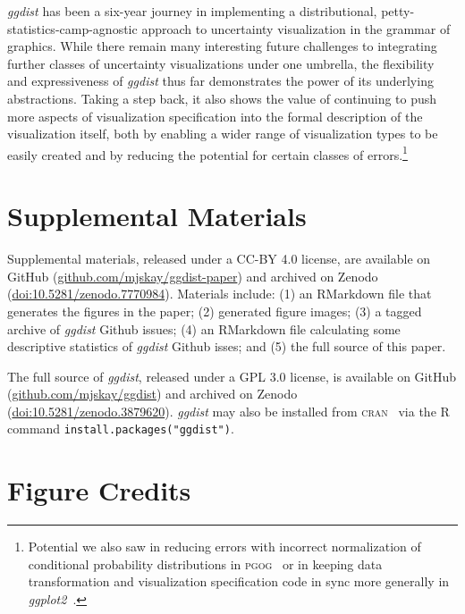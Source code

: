\documentclass[journal]{vgtc}                     %
\begin{document}
\textit{ggdist} has been a six-year journey in implementing a distributional, petty-statistics-camp-agnostic approach to uncertainty visualization in the grammar of graphics. While there remain many interesting future challenges to integrating further classes of uncertainty visualizations under one umbrella, the flexibility and expressiveness of \textit{ggdist} thus far demonstrates the power of its underlying abstractions. Taking a step back, it also shows the value of continuing to push more aspects of visualization specification into the formal description of the visualization itself, both by enabling a wider range of visualization types to be easily created and by reducing the potential for certain classes of errors.\footnote{Potential we also saw in reducing errors with incorrect normalization of conditional probability distributions in \textsc{pgog}~\cite{pu2020probabilistic} or in keeping data transformation and visualization specification code in sync more generally in \textit{ggplot2}~\cite{pu2023inpractice}.} 

\section*{Supplemental Materials}
\label{sec:supplemental_materials}

Supplemental materials, released under a CC-BY 4.0 license, are available on GitHub (\href{https://github.com/mjskay/ggdist-paper}{github.com/mjskay/ggdist-paper}) and archived on Zenodo (\href{https://doi.org/10.5281/zenodo.7770984}{doi:10.5281/zenodo.7770984}).
Materials include: (1) an RMarkdown file that generates the figures in the paper; (2) generated figure images; (3) a tagged archive of \textit{ggdist} Github issues; (4) an RMarkdown file calculating some descriptive statistics of \textit{ggdist} Github isses; and (5) the full source of this paper.

The full source of \textit{ggdist}, released under a GPL 3.0 license, is available on GitHub (\href{https://github.com/mjskay/ggdist}{github.com/mjskay/ggdist}) and archived on Zenodo (\href{https://doi.org/10.5281/zenodo.3879620}{doi:10.5281/zenodo.3879620}). \textit{ggdist} may also be installed from \textsc{cran}~\cite{hornik2012cran} via the R command \texttt{install.packages("ggdist")}.

\section*{Figure Credits}
\label{sec:figure_credits}
\end{document}

